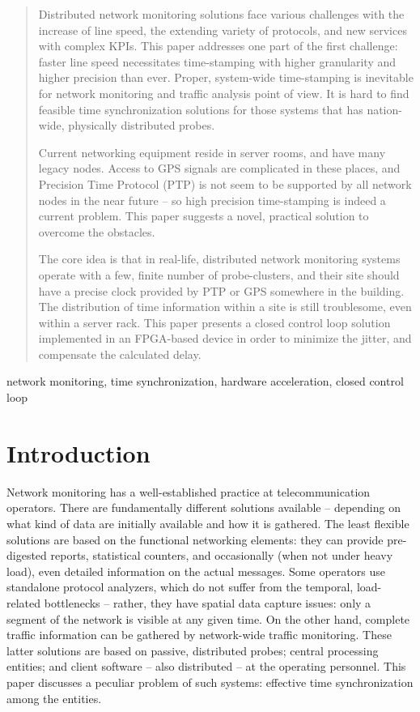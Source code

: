 \documentclass[journal]{IEEEtran}
\begin{document}
\begin{abstract}
    \boldmath
    Distributed network monitoring solutions face various challenges with the increase of line speed, the extending variety of protocols, and new services with complex KPIs. This paper addresses one part of the first challenge: faster line speed necessitates time-stamping with higher granularity and higher precision than ever. Proper, system-wide time-stamping is inevitable for network monitoring and traffic analysis point of view. It is hard to find feasible time synchronization solutions for those systems that has nation-wide, physically distributed probes.
    
    Current networking equipment reside in server rooms, and have many legacy nodes. Access to GPS signals are complicated in these places, and Precision Time Protocol (PTP) is not seem to be supported by all network nodes in the near future -- so high precision time-stamping is indeed a current problem. This paper suggests a novel, practical solution to overcome the obstacles. 
    
    The core idea is that in real-life, distributed network monitoring systems operate with a few, finite number of probe-clusters, and their site should have a precise clock provided by PTP or GPS somewhere in the building. The distribution of time information within a site is still troublesome, even within a server rack. This paper presents a closed control loop solution implemented in an FPGA-based device in order to minimize the jitter, and compensate the calculated delay.
    
\end{abstract}

\begin{IEEEkeywords}
    network monitoring, time synchronization, hardware acceleration, closed control loop 
\end{IEEEkeywords}

\section{Introduction}\label{sec:Intro}

Network monitoring has a well-established practice at telecommunication operators. There are fundamentally different solutions available -- depending on what kind of data are initially available and how it is gathered. The least flexible solutions are based on the functional networking elements: they can provide pre-digested reports, statistical counters, and occasionally (when not under heavy load), even detailed information on the actual messages. Some operators use standalone protocol analyzers, which do not suffer from the temporal, load-related bottlenecks -- rather, they have spatial data capture issues: only a segment of the network is visible at any given time. On the other hand, complete traffic information can be gathered by network-wide traffic monitoring. These latter solutions are based on passive, distributed probes; central processing entities; and client software -- also distributed -- at the operating personnel. This paper discusses a peculiar problem of such systems: effective time synchronization among the entities.
\end{document}

